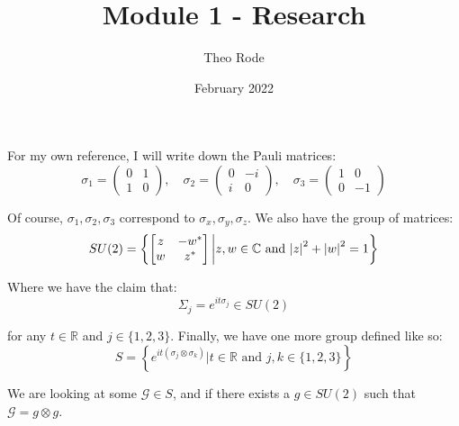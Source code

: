 \documentclass{article}
\title{Module 1 - Research}
\author{Theo Rode}
\date{February 2022}
\begin{document}
\maketitle
For my own reference, I will write down the Pauli matrices: 
\[ \sigma_1 = \begin{pmatrix} 0 & 1 \\ 1 & 0 \end{pmatrix}, \quad \sigma_2 = \begin{pmatrix} 0 & -i \\ i & 0 \end{pmatrix}, \quad \sigma_3 = \begin{pmatrix} 1 & 0 \\ 0 & -1 \end{pmatrix} \]

Of course, $\sigma_1, \sigma_2, \sigma_3$ correspond to $\sigma_x, \sigma_y, \sigma_z$. We also have the group of matrices:
\[ SU(2) = \left\{ \begin{bmatrix} z & -w^* \\ w & z^* \end{bmatrix} \biggl| z,w \in \mathbb C \text{ and } \abs{z}^2 + \abs{w}^2 = 1\right\} \]

Where we have the claim that: 
\[ \Sigma_j = e^{it\sigma_j} \in SU(2) \]

for any $t \in \mathbb R$ and $j \in \{1,2,3\}$. Finally, we have one more group defined like so:
\[ S = \left\{ e^{it(\sigma_j \otimes \sigma_k)} \biggl| t \in \mathbb R \text{ and } j,k \in \{1, 2, 3\} \right\} \]

We are looking at some $\mathcal G \in S$, and if there exists a $g \in SU(2)$ such that $\mathcal G = g \otimes g$. 
\end{document}
